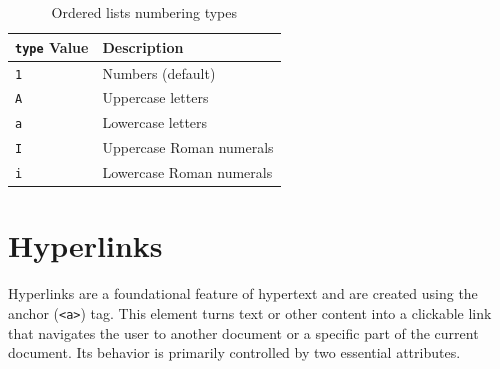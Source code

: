 \documentclass{scrbook}
\begin{document}
\begin{table}[h!]
    \centering
    \begin{tabularx}{\textwidth}{|p{5em}|X|} \hline
        \texttt{type} Value & Description \\ \hline
    
        \texttt{1} & Numbers (default) \\ \hline
    
        \texttt{A} & Uppercase letters \\ \hline
    
        \texttt{a} & Lowercase letters \\ \hline
    
        \texttt{I} & Uppercase Roman numerals \\ \hline
    
        \texttt{i} & Lowercase Roman numerals \\ \hline
    \end{tabularx}
    \caption{Ordered lists numbering types}
\end{table}

\section{Hyperlinks}

Hyperlinks are a foundational feature of hypertext and are created using the anchor (\texttt{<a>}) tag. This element turns text or other content into a clickable link that navigates the user to another document or a specific part of the current document. Its behavior is primarily controlled by two essential attributes.
\end{document}

